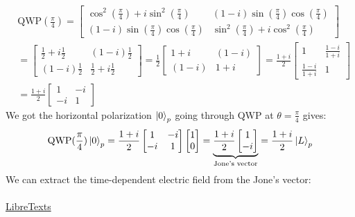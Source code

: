 \documentclass[12pt]{article}
\begin{document}
\begin{align}
	&\text{QWP}(\frac{\pi}{4})= 
	\begin{bmatrix}
		\cos^2 (\frac{\pi}{4}) + i \sin^2 (\frac{\pi}{4}) & (1-i) \sin(\frac{\pi}{4})\cos(\frac{\pi}{4})     \\
		(1-i) \sin(\frac{\pi}{4})\cos(\frac{\pi}{4})      & \sin^2 (\frac{\pi}{4}) + i \cos^2(\frac{\pi}{4})
	\end{bmatrix} \\[2ex]
	&= \begin{bmatrix}
		\frac{1}{2} + i \frac{1}{2} & (1-i) \frac{1}{2} \\
		(1-i) \frac{1}{2}          & \frac{1}{2} + i \frac{1}{2}
	\end{bmatrix} = 
	\frac{1}{2} 
	\begin{bmatrix}
		1+i & (1-i) \\
		(1-i) & 1+i
	\end{bmatrix} = \frac{1+i}{2}
	\begin{bmatrix}
		1 & \frac{1-i}{1+i}\\
		\frac{1-i}{1+i} & 1
	\end{bmatrix} \\[2ex]
	&= \frac{1+i}{2}
	\begin{bmatrix}
		1 & -i \\
		-i & 1
	\end{bmatrix}
\end{align}
We got the horizontal polarization \(\ket{0}_p\) going through QWP at \(\theta = \frac{\pi}{4}\) gives:
\begin{align}
    \text{QWP}(\frac{\pi}{4}) \ket{0}_p = \frac{1+i}{2}
    \begin{bmatrix}
        1 & -i \\
        -i & 1
    \end{bmatrix}
    \begin{bmatrix}
        1 \\
        0
    \end{bmatrix}
    = \underbrace{\frac{1+i}{2}
        \begin{bmatrix}
            1 \\
            -i
        \end{bmatrix}}_{\text{Jone's vector}}
    = \frac{1+i}{2} \ket{L}_p
\end{align}
We can extract the time-dependent electric field from the Jone's vector: \\ \\
\href{https://phys.libretexts.org/Bookshelves/Optics/BSc_Optics_(Konijnenberg_Adam_and_Urbach)/04%3A_Polarization/4.02%3A_Polarisation_States_and_Jones_Vectors}{LibreTexts}
\end{document}
